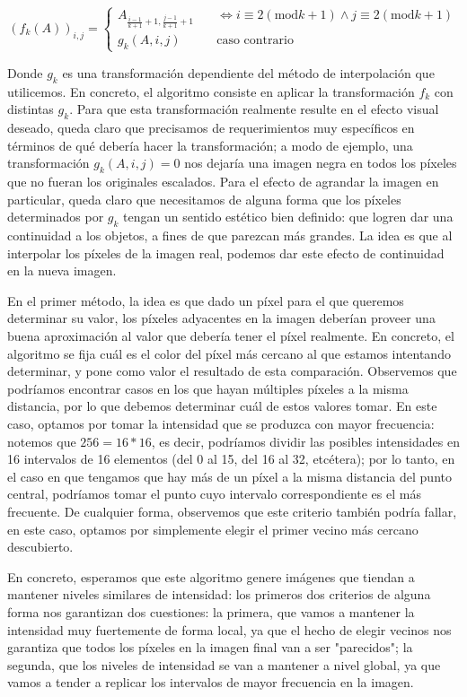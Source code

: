 \documentclass{article}
\begin{document}
$$(f_k(A))_{i, j} =
    \begin{cases}
        A_{\frac{i - 1}{k + 1} + 1, \frac{j - 1}{k + 1} + 1} & \quad \iff i \equiv 2 (\text{mod} k+1) \wedge j \equiv 2 (\text{mod} k+1) \\
        g_k(A, i, j) & \quad \text{caso contrario}
    \end{cases}$$

Donde $g_k$ es una transformación dependiente del método de interpolación que utilicemos. En concreto, el algoritmo consiste en aplicar la transformación $f_k$ con distintas $g_k$. Para que esta transformación realmente resulte en el efecto visual deseado, queda claro que precisamos de requerimientos muy específicos en términos de qué debería hacer la transformación; a modo de ejemplo, una transformación $g_k(A, i, j) = 0$ nos dejaría una imagen negra en todos los píxeles que no fueran los originales escalados. Para el efecto de agrandar la imagen en particular, queda claro que necesitamos de alguna forma que los píxeles determinados por $g_k$ tengan un sentido estético bien definido: que logren dar una continuidad a los objetos, a fines de que parezcan más grandes. La idea es que al interpolar los píxeles de la imagen real, podemos dar este efecto de continuidad en la nueva imagen.

En el primer método, la idea es que dado un píxel para el que queremos determinar su valor, los píxeles adyacentes en la imagen deberían proveer una buena aproximación al valor que debería tener el píxel realmente. En concreto, el algoritmo se fija cuál es el color del píxel más cercano al que estamos intentando determinar, y pone como valor el resultado de esta comparación. Observemos que podríamos encontrar casos en los que hayan múltiples píxeles a la misma distancia, por lo que debemos determinar cuál de estos valores tomar. En este caso, optamos por tomar la intensidad que se produzca con mayor frecuencia: notemos que $256 = 16 * 16$, es decir, podríamos dividir las posibles intensidades en 16 intervalos de 16 elementos (del 0 al 15, del 16 al 32, etcétera); por lo tanto, en el caso en que tengamos que hay más de un píxel a la misma distancia del punto central, podríamos tomar el punto cuyo intervalo correspondiente es el más frecuente. De cualquier forma, observemos que este criterio también podría fallar, en este caso, optamos por simplemente elegir el primer vecino más cercano descubierto.

En concreto, esperamos que este algoritmo genere imágenes que tiendan a mantener niveles similares de intensidad: los primeros dos criterios de alguna forma nos garantizan dos cuestiones: la primera, que vamos a mantener la intensidad muy fuertemente de forma local, ya que el hecho de elegir vecinos nos garantiza que todos los píxeles en la imagen final van a ser "parecidos"; la segunda, que los niveles de intensidad se van a mantener a nivel global, ya que vamos a tender a replicar los intervalos de mayor frecuencia en la imagen.
\end{document}
